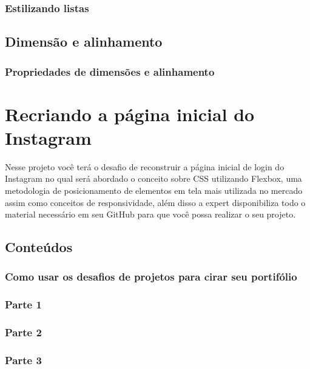 \documentclass[12pt,a4paper]{article}
\begin{document}
	\subsubsection{Estilizando listas}
	
	
	
	\subsection{Dimensão e alinhamento}
	\subsubsection{Propriedades de dimensões e alinhamento}
	
	
	
	\section{Recriando a página inicial do Instagram}
	
	Nesse projeto você terá o desafio de reconstruir a página inicial de login do Instagram no qual será abordado o conceito sobre CSS utilizando Flexbox, uma metodologia de posicionamento de elementos em tela mais utilizada no mercado assim como conceitos de responsividade, além disso a expert disponibiliza todo o material necessário em seu GitHub para que você possa realizar o seu projeto.
	
	\subsection{Conteúdos}
	\subsubsection{Como usar os desafios de projetos para cirar seu portifólio}
	
	\subsubsection{Parte 1}
	
	\subsubsection{Parte 2}
	
	\subsubsection{Parte 3}
	
\end{document}
